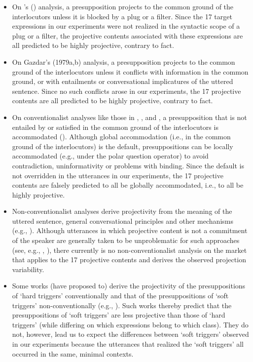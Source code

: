 \documentclass[11pt,fleqn]{article}
\newcommand{\6}{\mbox{$[\hspace*{-.6mm}[$}}
\newcommand{\9}{\mbox{$]\hspace*{-.6mm}]$}}
\newcommand{\citetpos}[1]{\citeauthor{#1}'s (\citeyear{#1})}
\begin{document}
\begin{itemize}[topsep=0pt,itemsep=-1pt]

\item On \citetpos{karttunen73} analysis, a presupposition projects to the common ground of the interlocutors unless it is blocked by a plug or a filter. Since the 17 target expressions in our experiments were not realized in the syntactic scope of a plug or a filter, the projective contents associated with these expressions are all predicted to be highly projective, contrary to fact.

\item On Gazdar's (1979a,b)\nocite{gazdar79a,gazdar79b} analysis, a presupposition projects to the common ground of the interlocutors unless it conflicts with information in the common ground, or with entailments or conversational implicatures of the uttered sentence. Since no such conflicts arose in our experiments, the 17 projective contents are all predicted to be highly projective, contrary to fact.

\item On conventionalist analyses like those in \citealt{heim83}, \citealt{vds92}, \citealt{beaver-krahmer2001} and \citealt{vds-geurts01}, a presupposition that is not entailed by or satisfied in the common ground of the interlocutors is accommodated (\citealt{lewis79}). Although global accommodation (i.e., in the common ground of the interlocutors) is the default, presuppositions can be locally accommodated (e.g., under the polar question operator) to avoid contradiction, uninformativity or problems with binding. Since  the default is not overridden in the utterances in our experiments, the 17 projective contents are falsely predicted to all be globally accommodated, i.e., to all be highly projective. 

\item Non-conventionalist analyses derive projectivity from the meaning of the uttered sentence, general conversational principles and other mechanisms (e.g., \citealt{stalnaker74,kempson75,levinson83,simons01,abusch10,best-question}). Although utterances in which projective content is not a commitment of the speaker are generally taken to be unproblematic for such approaches (see, e.g., \citealt[ch.4]{levinson83}, \citealt[ch.11]{kadmon01}), there currently is no non-conventionalist analysis on the market that applies to the 17 projective contents and derives the observed projection variability.

\item Some works (have proposed to) derive the projectivity of the presuppositions of `hard triggers' conventionally and that of the presuppositions of `soft triggers' non-conventionally (e.g., \citealt{kadmon01,simons01,abusch02,abusch10,abbott06,chemla09b,romoli2015}). Such works thereby predict that the presuppositions of `soft triggers' are less projective than those of `hard triggers' (while differing on which expressions belong to which class). They do not, however, lead us to expect the differences between `soft triggers' observed in our experiments because the utterances that realized the `soft triggers' all occurred in the same, minimal contexts.

\end{itemize}
\end{document}
